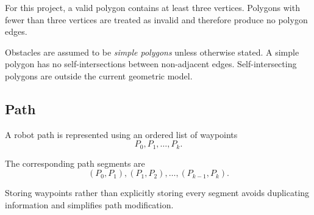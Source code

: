 For this project, a valid polygon contains at least three vertices. Polygons
with fewer than three vertices are treated as invalid and therefore produce no
polygon edges.

Obstacles are assumed to be \emph{simple polygons} unless otherwise stated. A
simple polygon has no self-intersections between non-adjacent edges.
Self-intersecting polygons are outside the current geometric model.

\subsection{Path}

A robot path is represented using an ordered list of waypoints
\[
P_0,P_1,\ldots,P_k.
\]

The corresponding path segments are
\[
(P_0,P_1),(P_1,P_2),\ldots,(P_{k-1},P_k).
\]

Storing waypoints rather than explicitly storing every segment avoids
duplicating information and simplifies path modification.
